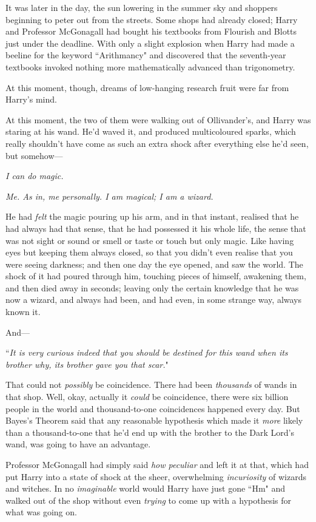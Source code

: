 \later

It was later in the day, the sun lowering in the summer sky and shoppers beginning to peter out from the streets. Some shops had already closed; Harry and Professor McGonagall had bought his textbooks from Flourish and Blotts just under the deadline. With only a slight explosion when Harry had made a beeline for the keyword ``Arithmancy" and discovered that the seventh-year textbooks invoked nothing more mathematically advanced than trigonometry.

At this moment, though, dreams of low-hanging research fruit were far from Harry's mind.

At this moment, the two of them were walking out of Ollivander's, and Harry was staring at his wand. He'd waved it, and produced multicoloured sparks, which really shouldn't have come as such an extra shock after everything else he'd seen, but somehow—

\emph{I can do magic.}

\emph{Me. As in, me personally. I am magical; I am a wizard.}

He had \emph{felt} the magic pouring up his arm, and in that instant, realised that he had always had that sense, that he had possessed it his whole life, the sense that was not sight or sound or smell or taste or touch but only magic. Like having eyes but keeping them always closed, so that you didn't even realise that you were seeing darkness; and then one day the eye opened, and saw the world. The shock of it had poured through him, touching pieces of himself, awakening them, and then died away in seconds; leaving only the certain knowledge that he was now a wizard, and always had been, and had even, in some strange way, always known it.

And—

``\emph{It is very curious indeed that you should be destined for this wand when its brother why, its brother gave you that scar.}"

That could not \emph{possibly} be coincidence. There had been \emph{thousands} of wands in that shop. Well, okay, actually it \emph{could} be coincidence, there were six billion people in the world and thousand-to-one coincidences happened every day. But Bayes's Theorem said that any reasonable hypothesis which made it \emph{more} likely than a thousand-to-one that he'd end up with the brother to the Dark Lord's wand, was going to have an advantage.

Professor McGonagall had simply said \emph{how peculiar} and left it at that, which had put Harry into a state of shock at the sheer, overwhelming \emph{incuriosity} of wizards and witches. In no \emph{imaginable} world would Harry have just gone ``Hm" and walked out of the shop without even \emph{trying} to come up with a hypothesis for what was going on.

